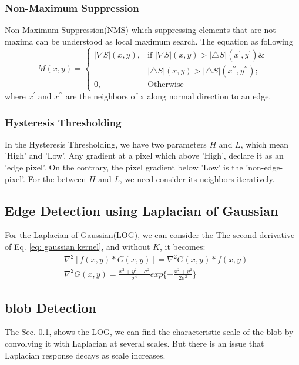 \documentclass[final]{cvpr}
\begin{document}
\subsubsection{Non-Maximum Suppression}
Non-Maximum Suppression(NMS) which suppressing elements that are not maxima can be understood as local maximum search. The equation as following
\begin{equation*}\label{eq: nonmaxsup}
M(x,y)= \begin{cases}
|\nabla S|(x,y),  &\text{if } |\nabla S|(x,y) > |\triangle S|(x^\prime,y^\prime)  \& \\ 
&|\triangle S|(x,y)>|\triangle S|(x^{\prime \prime},y^{\prime \prime});    \\
0,  &\text{Otherwise}
\end{cases}
\end{equation*}
where $x ^\prime $ and $x^{\prime \prime} $ are the neighbors of x along normal direction to an edge.

\subsubsection{Hysteresis Thresholding}
In the Hysteresis Thresholding, we have two parameters $H$ and $L$, which mean 'High' and 'Low'. Any gradient at a pixel which above 'High', declare it as an 'edge pixel'. On the contrary, the pixel gradient below 'Low' is the 'non-edge-pixel'. For the between $H$ and $L$, we need consider its neighbors iteratively. 


\subsection{Edge Detection using Laplacian of Gaussian}\label{sec: log}
For the Laplacian of Gaussian(LOG), we can consider the The second derivative of Eq. \eqref{eq: gaussian kernel}, and without $K$, it becomes:
\begin{align}
   & \nabla ^2[f(x,y)*G(x,y)]=\nabla ^2 G(x,y)*f(x,y) \\
   & \nabla ^2 G(x,y)= \frac{x^2+y^2-\sigma^2}{\sigma^4} exp\{-\frac{x^2+y^2}{2\sigma^2}\}
\end{align}

\subsection{blob Detection}
The Sec. \ref{sec: log}, shows the LOG, we can find the characteristic scale of the 
blob by convolving it with Laplacian at several scales. But there is an issue that Laplacian response decays as scale increases.
\end{document}
